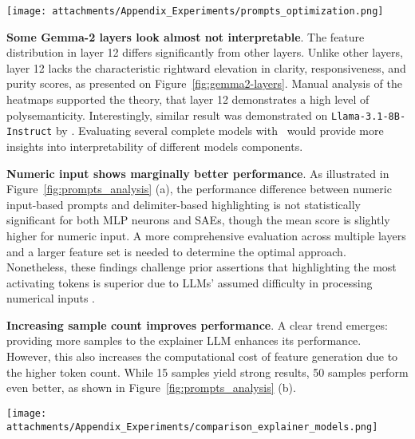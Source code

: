 \begin{figure*}[t]
    \centering
    \texttt{[image: attachments/Appendix\_Experiments/prompts\_optimization.png]}
    \caption{Analysis of the main prompt's components: (a) numeric input vs delimeter-based; (b) number of activating samples, provided to the explainer LLM; (c) number of shots used in the prompt. }
    \label{fig:prompts_analysis}
\end{figure*}

\textbf{Some Gemma-2 layers look almost not interpretable}. 
The feature distribution in layer 12 differs significantly from other layers. Unlike other layers, layer 12 lacks the characteristic rightward elevation in clarity, responsiveness, and purity scores, as presented on Figure~\ref{fig:gemma2-layers}. Manual analysis of the heatmaps supported the theory, that layer 12 demonstrates a high level of polysemanticity. Interestingly, similar result was demonstrated on \texttt{Llama-3.1-8B-Instruct} by \cite{choi2024automatic}. Evaluating several complete models with \ours\ would provide more insights into interpretability of different models components. 

\textbf{Numeric input shows marginally better performance}. As illustrated in Figure~\ref{fig:prompts_analysis} (a), the performance difference between numeric input-based prompts and delimiter-based highlighting is not statistically significant for both MLP neurons and SAEs, though the mean score is slightly higher for numeric input. A more comprehensive evaluation across multiple layers and a larger feature set is needed to determine the optimal approach. Nonetheless, these findings challenge prior assertions that highlighting the most activating tokens is superior due to LLMs' assumed difficulty in processing numerical inputs \cite{choi2024automatic}.

\textbf{Increasing sample count improves performance}. A clear trend emerges: providing more samples to the explainer LLM enhances its performance. However, this also increases the computational cost of feature generation due to the higher token count. While 15 samples yield strong results, 50 samples perform even better, as shown in Figure~\ref{fig:prompts_analysis} (b).


\begin{figure*}
    \centering
    \texttt{[image: attachments/Appendix\_Experiments/comparison\_explainer\_models.png]}
    \caption{Performance of feature descriptions generation via different explainer LLMs.}
    \label{fig:explainer-models}
\end{figure*}

